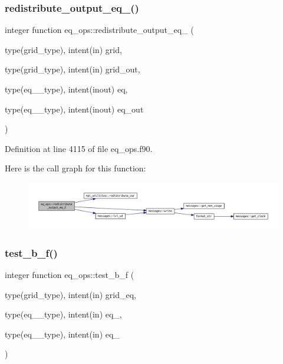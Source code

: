 \subsubsection{\texorpdfstring{redistribute\+\_\+output\+\_\+eq\+\_()}{redistribute\_output\_eq\_2()}}
{\footnotesize\ttfamily integer function eq\+\_\+ops\+::redistribute\+\_\+output\+\_\+eq\+\_ (\begin{DoxyParamCaption}\item[{type(grid\+\_\+type), intent(in)}]{grid,  }\item[{type(grid\+\_\+type), intent(in)}]{grid\+\_\+out,  }\item[{type(eq\+\_\+2\+\_\+type), intent(inout)}]{eq,  }\item[{type(eq\+\_\+2\+\_\+type), intent(inout)}]{eq\+\_\+out }\end{DoxyParamCaption})}



Definition at line 4115 of file eq\+\_\+ops.\+f90.

Here is the call graph for this function\+:
\nopagebreak
\begin{figure}[H]
\begin{center}
\leavevmode
\includegraphics[width=350pt]{namespaceeq__ops_a34003959915249394273824108af61e0_cgraph}
\end{center}
\end{figure}
\mbox{\label{namespaceeq__ops_a8082c12510696bd8ffdd0deef41860c2}} 
\subsubsection{\texorpdfstring{test\+\_\+b\+\_\+f()}{test\_b\_f()}}
{\footnotesize\ttfamily integer function eq\+\_\+ops\+::test\+\_\+b\+\_\+f (\begin{DoxyParamCaption}\item[{type(grid\+\_\+type), intent(in)}]{grid\+\_\+eq,  }\item[{type(eq\+\_\+1\+\_\+type), intent(in)}]{eq\+\_,  }\item[{type(eq\+\_\+2\+\_\+type), intent(in)}]{eq\+\_ }\end{DoxyParamCaption})}




